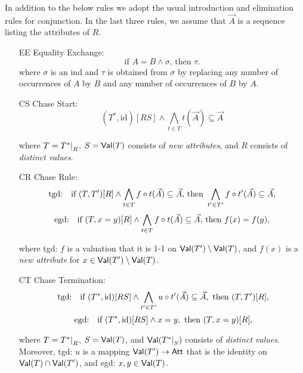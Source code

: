 \documentclass[envcountset]{llncs}
\newcommand{\problemFont}[1]{\protect\ensuremath{\mathsf{#1}}}
\newcommand{\si}{\sigma}
\newcommand{\sub}{\subseteq}
\newcommand{\tuple}[1]{\vec{#1}}
\newcommand{\ja}{\wedge}
\newcommand{\at}{\problemFont{Att}}
\newcommand\re[2]{{\left.\kern-\nulldelimiterspace #1 \vphantom{|} \right|_{#2} }}
\newcommand{\Val}{\problemFont{Val}}
\newcommand{\id}{\mathrm{id}}
\begin{document}
\begin{definition}\label{axioms}
In addition to the below rules we adopt the usual introduction and elimination rules for conjunction. In the last three rules, we assume that $\tuple A$ is a sequence listing the attributes of $R$.
\\
\begin{itemize}







\item[EE] Equality Exchange: $$\textrm{if }A=B  \ja \sigma \textrm{, then } \tau.$$
where $\si$ is an ind and $\tau$ is obtained from $\si$ by replacing any number of occurrences of $A$ by $B$ and any number of occurrences of $B$ by $A$.








\item[CS] Chase Start: $$(T^*,\id)[RS]\ja \bigwedge_{t\in T}   t(\tuple A) \sub  \tuple A$$

where $T=\re{T^*}{R}$, $S= \Val(T)$  consists of \emph{new attributes}, and $R$ consists of \emph{distinct values}. 

\item[CR] Chase Rule: 
$$\textrm{\hspace{0cm}tgd:\quad}\textrm{if }( T, T')[R] \ja \bigwedge_{t\in T}f\circ  t(\tuple A) \sub \tuple  A \textrm{, then } \bigwedge_{t'\in T'}f\circ  t'(\tuple A) \sub \tuple A,$$
$$\hspace{0cm}\textrm{egd:\quad}\textrm{if }(T,x=y)[R] \ja \bigwedge_{t\in T} f\circ  t(\tuple A) \sub \tuple A \textrm{, then } f(x)=f(y),$$

where tgd: $f$ is a valuation that it is 1-1 on $\Val(T')\setminus\Val(T)$, and $f(x)$ is a \emph{new attribute} for $x\in \Val(T')\setminus\Val(T)$.

\item[CT] Chase Termination: 
$$\textrm{\hspace{0cm} tgd:\quad}\textrm{if }(T^*,\id)[R S]\ja\bigwedge_{t'\in T'} u\circ t'(\tuple A)\sub \tuple A
,\textrm{ then } (T ,T')[ R],$$
$$\textrm{\hspace{0cm} egd:\quad}\textrm{if }(T^*,\id)[ R  S]\ja x=y
,\textrm{ then } (T ,x=y)[R],$$



where  $T=\re{T^*}{R}$, $S= \Val(T)$, and $\Val(\re{T^*}{S})$ consists of \emph{distinct values}. Moreover, tgd: $u$ is a mapping  $\Val(T')\to \at$ that is the identity on $\Val(T)\cap\Val(T')$, and egd: $x,y\in \Val(T)$.
\end{itemize}
\end{definition}
\end{document}

